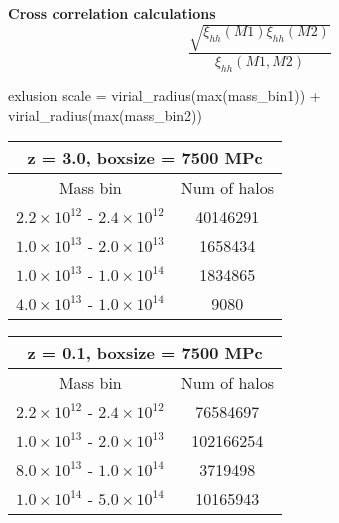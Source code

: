 \documentclass[12pt]{article}
\title{}
\begin{document}
{\centering \bf \Large Cross correlation calculations }\\ 

\begin{equation}
	\label{ratio}
	 \frac{\sqrt{\xi_{hh}(M1)\xi_{hh}(M2)}}{\xi_{hh}(M1,M2)}
\end{equation}

exlusion scale = virial\_radius(max(mass\_bin1)) + virial\_radius(max(mass\_bin2))

\begin{multicols}{2}
\begin{center}
\begin{tabular}{ |c|c|} 
\hline
\multicolumn{2}{|c|}{z = 3.0, boxsize = 7500 MPc}\\
 \hline
 Mass bin & Num of halos \\ 
 \hline
 $2.2 \times 10^{12}$ - $2.4 \times 10^{12}$ & 40146291 \\ 
 $1.0 \times 10^{13}$ - $2.0 \times 10^{13}$ & 1658434 \\
 $1.0 \times 10^{13}$ - $1.0 \times 10^{14}$ & 1834865 \\  
  $4.0 \times 10^{13}$ - $1.0 \times 10^{14}$ & 9080 \\ 
 \hline
\end{tabular}
\end{center}
\columnbreak
\begin{center}
\begin{tabular}{ |c|c|} 
\hline
\multicolumn{2}{|c|}{z = 0.1, boxsize = 7500 MPc}\\
 \hline
 Mass bin & Num of halos \\ 
 \hline
 $2.2 \times 10^{12}$ - $2.4 \times 10^{12}$ & 76584697 \\ 
 $1.0 \times 10^{13}$ - $2.0 \times 10^{13}$ & 102166254 \\ 
  $8.0 \times 10^{13}$ - $1.0 \times 10^{14}$ & 3719498 \\ 
  $1.0 \times 10^{14}$ - $5.0 \times 10^{14}$ & 10165943 \\ 
 \hline
\end{tabular}
\end{center}
\end{multicols}
\end{document}
